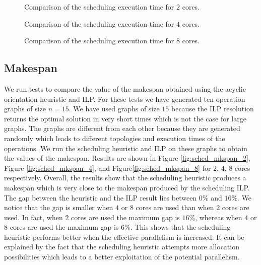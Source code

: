 \begin{figure}[phbt]
\centering

\caption{Comparison of the scheduling execution time for $2$ cores.}
\label{fig:sched_exec_2}
\end{figure}

\begin{figure}[phbt]
\centering

\caption{Comparison of the scheduling execution time for $4$ cores.}
\label{fig:sched_exec_4}
\end{figure}

\begin{figure}[phbt]
\centering

\caption{Comparison of the scheduling execution time for $8$ cores.}
\label{fig:sched_exec_8}
\end{figure}

\subsection{Makespan}

We run tests to compare the value of the makespan obtained using the acyclic orientation heuristic and ILP. For these tests we have generated ten operation graphs of size $n = 15$. We have used graphs of size $15$ because the ILP resolution returns the optimal solution in very short times which is not the case for large graphs. The graphs are different from each other because they are generated randomly which leads to different topologies and execution times of the operations. We run the scheduling heuristic and ILP on these graphs to obtain the values of the makespan. Results are shown in Figure \ref{fig:sched_mkspan_2}, Figure \ref{fig:sched_mkspan_4}, and Figure\ref{fig:sched_mkspan_8} for $2$, $4$, $8$ cores respectively. Overall, the results show that the scheduling heuristic produces a makespan which is very close to the makespan produced by the scheduling ILP. The gap between the heuristic and the ILP result lies between $0\%$ and $16\%$. We notice that the gap is smaller when $4$ or $8$ cores are used than when $2$ cores are used. In fact, when $2$ cores are used the maximum gap is $16\%$, whereas when $4$ or $8$ cores are used the maximum gap is $6\%$. This shows that the scheduling heuristic performs better when the effective parallelism is increased. It can be explained by the fact that the scheduling heuristic attempts more allocation possibilities which leads to a better exploitation of the potential parallelism.

